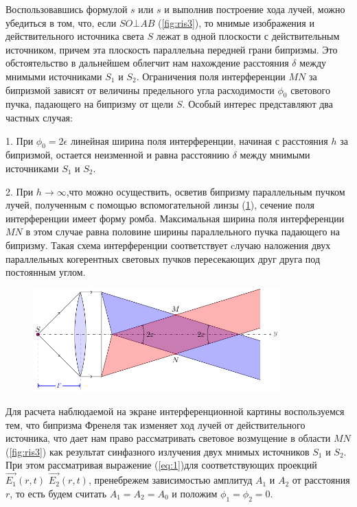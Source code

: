 Воспользовавшись формулой $s$ или $s$ и выполнив построение хода лучей, можно убедиться в том, что, если $SO\bot AB$ (\ref{fig:ris3}), то мнимые изображения и	действительного источника света $S$ лежат в одной плоскости с действительным источником, причем эта плоскость параллельна передней грани бипризмы. Это обстоятельство в дальнейшем облегчит нам нахождение расстояния $\delta$ между мнимыми источниками $S_1$ и	$S_2$.
Ограничения поля интерференции $MN$ за бипризмой зависят от величины предельного угла расходимости $\phi_0$ светового пучка, падающего на бипризму от щели $S$. Особый интерес представляют два частных случая:

1. При $\phi_0 = 2\epsilon$	линейная ширина поля интерференции,
начиная с расстояния $h$ за бипризмой, остается неизменной и равна расстоянию $\delta$ между мнимыми источниками $S_1$ и $S_2$.

2. При $h\rightarrow\infty$,что можно осуществить,
осветив бипризму параллельным пучком лучей, полученным с помощью вспомогательной линзы (\ref{fig:ris4}), сечение поля интерференции имеет форму ромба. Максимальная ширина поля интерференции $MN$ в этом случае равна половине ширины параллельного пучка падающего на бипризму. Такая схема интерференции соответствует cлучаю наложения двух параллельных когерентных световых пучков
пересекающих друг друга под постоянным углом.
\begin{figure}[H]
	\centering
	\includegraphics[width=0.85\textwidth]{ris/ris4}
	\caption{ }
	\label{fig:ris4}
\end{figure}
Для расчета наблюдаемой на экране интерференционной картины воспользуемся тем, что бипризма Френеля так изменяет ход лучей от действительного источника, что дает нам право рассматривать световое возмущение в области $MN$ (\ref{fig:ris3}) как результат синфазного излучения двух мнимых источников $S_1$ и $S_2$. При этом рассматривая выражение (\ref{eq:1})для соответствующих проекций $\vec{E_1}(r,t)$ $\vec{E_2}(r,t)$, пренебрежем зависимостью амплитуд $A_1$ и $A_2$ от расстояния $r$, то есть будем считать $A_1=A_2=A_0$	и положим $\phi_1=\phi_2=0$.

